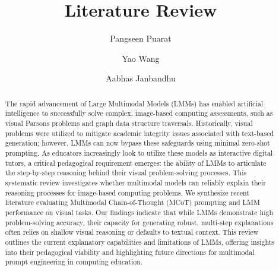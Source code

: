 \documentclass[sigconf, nonacm]{acmart}
\begin{document}
\title{Literature Review}

\author{Pangseen Puarat}

\author{Yao Wang}

\author{Aabhas Janbandhu}


\begin{abstract}
  The rapid advancement of Large Multimodal Models (LMMs) has enabled artificial intelligence to successfully solve complex, 
  image-based computing assessments, such as visual Parsons problems and graph data structure traversals. 
  Historically, visual problems were utilized to mitigate academic integrity issues associated with text-based generation; 
  however, LMMs can now bypass these safeguards using minimal zero-shot prompting. 
  As educators increasingly look to utilize these models as interactive digital tutors, 
  a critical pedagogical requirement emerges: the ability of LMMs to articulate the step-by-step 
  reasoning behind their visual problem-solving processes. This systematic review investigates whether multimodal models 
  can reliably explain their reasoning processes for image-based computing problems. We synthesize recent literature evaluating 
  Multimodal Chain-of-Thought (MCoT) prompting and LMM performance on visual tasks. Our findings indicate that 
  while LMMs demonstrate high problem-solving accuracy, their capacity for generating robust, multi-step explanations 
  often relies on shallow visual reasoning or defaults to textual context. This review outlines the current explanatory 
  capabilities and limitations of LMMs, offering insights into their pedagogical viability and highlighting future directions 
  for multimodal prompt engineering in computing education.
\end{abstract}
\end{document}
